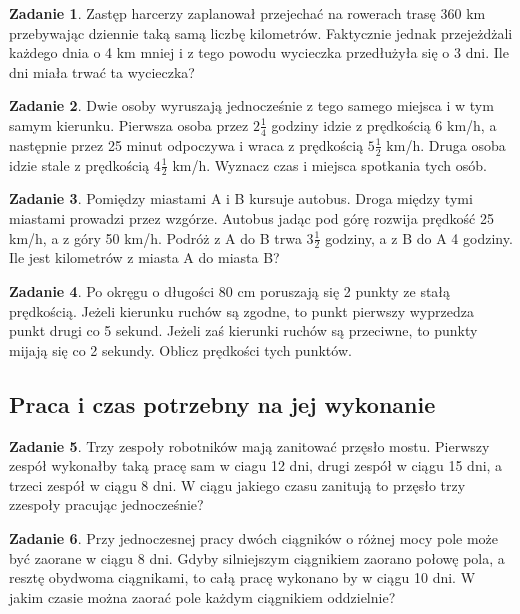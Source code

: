 \documentclass[11pt]{article}
\theoremstyle{definition}
\newtheorem{zad}{Zadanie}
\numberwithin{zad}{section}
\begin{document}
\begin{zad}
Zastęp harcerzy zaplanował przejechać na rowerach trasę 360 km przebywając dziennie taką samą liczbę kilometrów. Faktycznie jednak przejeżdżali każdego dnia o 4 km mniej i z tego powodu wycieczka przedłużyła się o 3 dni. Ile dni miała trwać ta wycieczka?
\end{zad}

\begin{zad}
Dwie osoby wyruszają jednocześnie z tego samego miejsca i w tym samym kierunku. Pierwsza osoba przez $2\frac14$ godziny idzie z prędkością 6 km/h, a następnie przez 25 minut odpoczywa i wraca z prędkością $5\frac12$ km/h. Druga osoba idzie stale z prędkością $4\frac12$ km/h. Wyznacz czas i miejsca spotkania tych osób.
\end{zad}


\begin{zad}
Pomiędzy miastami A i B kursuje autobus. Droga między tymi miastami prowadzi przez wzgórze. Autobus jadąc pod górę rozwija prędkość 25 km/h, a z góry 50 km/h. Podróż z A do B trwa $3\frac12$ godziny, a z B do A 4 godziny. Ile jest kilometrów z miasta A do miasta B?
\end{zad}

\begin{zad}
Po okręgu o długości 80 cm poruszają się 2 punkty ze stałą prędkością. Jeżeli kierunku ruchów są zgodne, to punkt pierwszy wyprzedza punkt drugi co 5 sekund. Jeżeli zaś kierunki ruchów są przeciwne, to punkty mijają się co 2 sekundy. Oblicz prędkości tych punktów.
\end{zad}

\subsection{Praca i czas potrzebny na jej wykonanie}

\begin{zad}
Trzy zespoły robotników mają zanitować przęsło mostu. Pierwszy zespół wykonałby taką pracę sam w ciagu 12 dni, drugi zespół w ciągu 15 dni, a trzeci zespół w ciągu 8 dni. W ciągu jakiego czasu zanitują to przęsło trzy zzespoły pracując jednocześnie?
\end{zad}

\begin{zad}
Przy jednoczesnej pracy dwóch ciągników o różnej mocy pole może być zaorane w ciągu 8 dni. Gdyby silniejszym ciągnikiem zaorano połowę pola, a resztę obydwoma ciągnikami, to całą pracę wykonano by w ciągu 10 dni. W jakim czasie można zaorać pole każdym ciągnikiem oddzielnie?
\end{zad}
\end{document}
